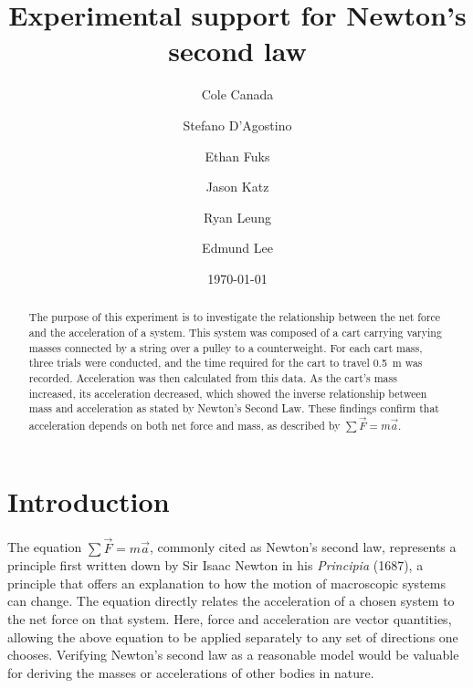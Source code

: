 \documentclass[reprint,amsmath,amssymb,aps]{revtex4-2}
\begin{document}
\title{Experimental support for Newton's second law}
\author{Cole Canada}
\author{Stefano D'Agostino}
\author{Ethan Fuks}
\author{Jason Katz}
\author{Ryan Leung}
\author{Edmund Lee}
\date{\today} 

\begin{abstract}
The purpose of this experiment is to investigate the relationship between the net force and the acceleration of a system. This system was composed of a cart carrying varying masses connected by a string over a pulley to a counterweight. For each cart mass, three trials were conducted, and the time required for the cart to travel \qty{0.5}{\meter} was recorded. Acceleration was then calculated from this data. As the cart’s mass increased, its acceleration decreased, which showed the inverse relationship between mass and acceleration as stated by Newton's Second Law. These findings confirm that acceleration depends on both net force and mass, as described by  $\sum\vec{F} = m\vec{a}$.
\end{abstract}


\maketitle





\section{Introduction}\label{sec:introduction}
The equation $\sum\vec{F} = m\vec{a}$, commonly cited as Newton’s second law, represents a principle first written down by Sir Isaac Newton \cite{newton1687principia} in his \textit{Principia} (1687), a principle that offers an explanation to how the motion of macroscopic systems can change. The equation directly relates the acceleration of a chosen system to the net force on that system. Here, force and acceleration are vector quantities, allowing the above equation to be applied separately to any set of directions one chooses. Verifying Newton’s second law as a reasonable model would be valuable for deriving the masses or accelerations of other bodies in nature.
\end{document}
